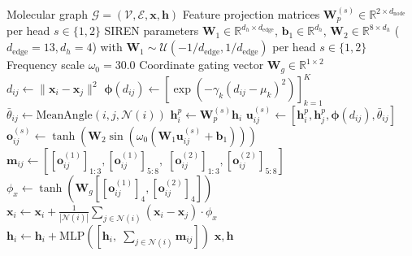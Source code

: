 \documentclass[10pt,twocolumn,letterpaper]{article}
\begin{document}
\begin{algorithm}[t]
\caption{PRISM Forward Pass (Single Layer)}
\label{alg:prism}
\begin{algorithmic}[1]
\REQUIRE Molecular graph $\mathcal{G} = (\mathcal{V}, \mathcal{E}, \mathbf{x}, \mathbf{h})$
\REQUIRE Feature projection matrices $\mathbf{W}_p^{(s)} \in \mathbb{R}^{2 \times d_{\mathrm{node}}}$ per head $s \in \{1,2\}$
\REQUIRE SIREN parameters $\mathbf{W}_1 \in \mathbb{R}^{d_h \times d_{\mathrm{edge}}}$, $\mathbf{b}_1 \in \mathbb{R}^{d_h}$, $\mathbf{W}_2 \in \mathbb{R}^{8 \times d_h}$ ($d_{\mathrm{edge}} = 13, d_h = 4$) with $\mathbf{W}_1 \sim \mathcal{U}(-1/d_{\mathrm{edge}}, 1/d_{\mathrm{edge}})$ per head $s \in \{1,2\}$
\REQUIRE Frequency scale $\omega_0 = 30.0$
\REQUIRE Coordinate gating vector $\mathbf{W}_g \in \mathbb{R}^{1 \times 2}$
    \STATE $d_{ij} \leftarrow \|\mathbf{x}_i - \mathbf{x}_j\|^2$ 
    \STATE $\boldsymbol{\phi}(d_{ij}) \leftarrow [\exp(-\gamma_k(d_{ij} - \mu_k)^2)]_{k=1}^K$ 
    \STATE $\bar{\theta}_{ij} \leftarrow \text{MeanAngle}(i, j, \mathcal{N}(i))$ 
        \STATE $\mathbf{h}_i^{p} \leftarrow \mathbf{W}_p^{(s)} \mathbf{h}_i$ 
        \STATE $\mathbf{u}_{ij}^{(s)} \leftarrow [\mathbf{h}_i^p, \mathbf{h}_j^p, \boldsymbol{\phi}(d_{ij}), \bar{\theta}_{ij}]$ 
        \STATE $\mathbf{o}_{ij}^{(s)} \leftarrow \tanh(\mathbf{W}_2 \sin(\omega_0(\mathbf{W}_1 \mathbf{u}_{ij}^{(s)} + \mathbf{b}_1)))$ \label{alg:prism_edge} 
    \ENDFOR
    \STATE $\mathbf{m}_{ij} \leftarrow [[\mathbf{o}_{ij}^{(1)}]_{1:3}, [\mathbf{o}_{ij}^{(1)}]_{5:8},\; [\mathbf{o}_{ij}^{(2)}]_{1:3}, [\mathbf{o}_{ij}^{(2)}]_{5:8}]$ 
    \STATE $\phi_x \leftarrow \tanh(\mathbf{W}_g [[\mathbf{o}_{ij}^{(1)}]_4, [\mathbf{o}_{ij}^{(2)}]_4])$ 
\ENDFOR
{}
    \STATE $\mathbf{x}_i \leftarrow \mathbf{x}_i + \frac{1}{|\mathcal{N}(i)|}\sum_{j \in \mathcal{N}(i)} (\mathbf{x}_i - \mathbf{x}_j) \cdot \phi_x$
    \STATE $\mathbf{h}_i \leftarrow \mathbf{h}_i + \text{MLP}([\mathbf{h}_i,\; \sum_{j \in \mathcal{N}(i)} \mathbf{m}_{ij}])$
\ENDFOR
\RETURN $\mathbf{x}, \mathbf{h}$
\end{algorithmic}
\end{algorithm}
\end{document}
